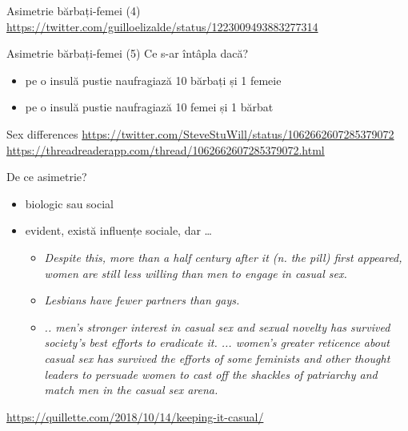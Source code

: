 \documentclass{simple}
\begin{document}
\begin{frame}{Asimetrie bărbați-femei (4)}
  \url{https://twitter.com/guilloelizalde/status/1223009493883277314}
\end{frame}

\begin{frame}{Asimetrie bărbați-femei (5)}
  \pause
  Ce s-ar întâpla dacă?
  \begin{itemize}
    \pause
    \item pe o insulă pustie naufragiază 10 bărbați și 1 femeie
    \pause
    \item pe o insulă pustie naufragiază 10 femei și 1 bărbat
  \end{itemize}
\end{frame}

\begin{frame}{Sex differences}
  \url{https://twitter.com/SteveStuWill/status/1062662607285379072}
  \url{https://threadreaderapp.com/thread/1062662607285379072.html}
\end{frame}

\begin{frame}{De ce asimetrie?}
  \begin{itemize}
    \pause
    \item biologic sau social
    \pause
    \item evident, există influențe sociale, dar \ldots{}
      \begin{itemize}
        \pause
        \item \textit{Despite this, more than a half century after it (n. the pill) first appeared, women are still less willing than men to engage in casual sex.}
        \pause
        \item \textit{Lesbians have fewer partners than gays.}
        \pause
        \item \textit{.. men's stronger interest in casual sex and sexual novelty has survived society's best efforts to eradicate it. ... women's greater reticence about casual sex has survived the efforts of some feminists and other thought leaders to persuade women to cast off the shackles of patriarchy and match men in the casual sex arena.}
      \end{itemize}
  \end{itemize}
  \url{https://quillette.com/2018/10/14/keeping-it-casual/}
\end{frame}
\end{document}

